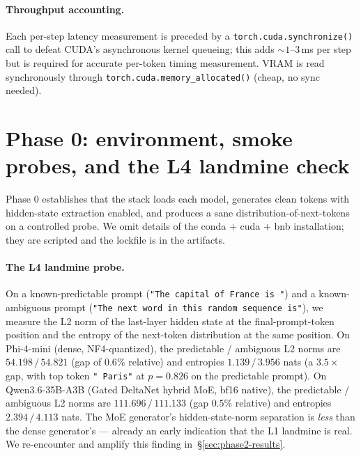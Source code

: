 \documentclass[11pt,letterpaper]{article}
\begin{document}
\paragraph{Throughput accounting.} Each per-step latency measurement is
preceded by a \verb|torch.cuda.synchronize()| call to defeat CUDA's
asynchronous kernel queueing; this adds $\sim 1$--$3$\,ms per step but
is required for accurate per-token timing measurement. VRAM is read
synchronously through \verb|torch.cuda.memory_allocated()| (cheap, no
sync needed).

\section{Phase 0: environment, smoke probes, and the L4 landmine check}
\label{sec:phase0}


Phase 0 establishes that the stack loads each model, generates clean
tokens with hidden-state extraction enabled, and produces a sane
distribution-of-next-tokens on a controlled probe. We omit details
of the conda + cuda + bnb installation; they are scripted and the
lockfile is in the artifacts.

\paragraph{The L4 landmine probe.} On a known-predictable prompt
(\verb|"The capital of France is "|) and a known-ambiguous prompt
(\verb|"The next word in this random sequence is"|), we measure the L2
norm of the last-layer hidden state at the final-prompt-token position
and the entropy of the next-token distribution at the same position.
On Phi-4-mini (dense, NF4-quantized), the
predictable / ambiguous L2 norms are
$54.198 \,/\, 54.821$ (gap of $0.6\%$ relative) and entropies
$1.139 \,/\, 3.956$ nats (a $3.5\times$ gap, with top token
\verb|" Paris"| at $p = 0.826$ on the predictable prompt). On
Qwen3.6-35B-A3B (Gated DeltaNet hybrid MoE, bf16 native), the
predictable / ambiguous L2 norms are $111.696 \,/\, 111.133$ (gap
$0.5\%$ relative) and entropies $2.394 \,/\, 4.113$ nats. The MoE
generator's hidden-state-norm separation is \emph{less} than the dense
generator's — already an early indication that the L1 landmine is real.
We re-encounter and amplify this finding in~\S\ref{sec:phase2-results}.
\end{document}
